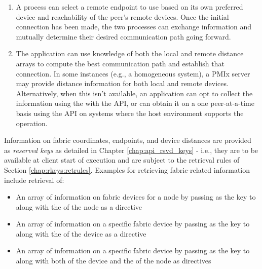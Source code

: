 \begin{enumerate}[label=\alph*)]
    \item A process can select a remote endpoint to use based on its own preferred device and reachability of the peer's remote devices. Once the initial connection has been made, the two processes can exchange information and mutually determine their desired communication path going forward.

    \item The application can use knowledge of both the local and remote distance arrays to compute the best communication path and establish that connection. In some instances (e.g., a homogeneous system), a \ac{PMIx} server may provide distance information for both local and remote devices. Alternatively, when this isn't available, an application can opt to collect the information using the  with the  \ac{API}, or can obtain it on a one peer-at-a-time basis using the  \ac{API} on systems where the host environment supports the  operation.

\end{enumerate}

Information on fabric coordinates, endpoints, and device distances are provided as \emph{reserved keys} as detailed in Chapter \ref{chap:api_rsvd_keys} - i.e., they are to be available at client start of execution and are subject to the retrieval rules of Section \ref{chap:rkeys:retrules}. Examples for retrieving fabric-related information include retrieval of:

\begin{itemize}
    \item An array of information on fabric devices for a node by passing  as the key to  along with the  of the node as a directive

    \item An array of information on a specific fabric device by passing  as the key to  along with the  of the device as a directive

    \item An array of information on a specific fabric device by passing  as the key to  along with both  of the device and the  of the node as directives
\end{itemize}

